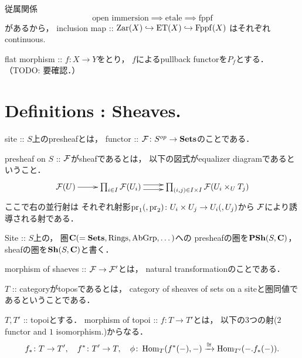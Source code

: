 \documentclass[a4paper]{jsarticle}
\begin{document}
\begin{Example}
    従属関係
    \[ \text{open immersion} \implies \text{etale} \implies \text{fppf} \]
    があるから，
    inclusion map :: $\mathrm{Zar}(X) \hookrightarrow \mathrm{ET}(X) \hookrightarrow \mathrm{Fppf}(X)$
    はそれぞれcontinuous.
\end{Example}

\begin{Example}
    flat morphism :: $f \colon X \to Y$をとり，
    $f$によるpullback functorを$P_{f}$とする．
    （TODO: 要確認．）
\end{Example}

\section{Definitions : Sheaves.}
\begin{Def}
    \begin{myenum}{\roman*}
    \item
    site :: $S$上のpresheafとは，
    functor :: $\mathcal{F} \colon S^{op} \to \mathbf{Sets}$のことである．

    \item
    presheaf on $S$ :: $\mathcal{F}$がsheafであるとは，
    以下の図式がequalizer diagramであるということ．
    \[\xymatrix{
        \shF(U) \ar[r]& \prod_{i \in I} \shF(U_i)
            \ar@<1mm>[r]\ar@<-1mm>[r]& \prod_{(i,j) \in I \times I} \shF(U_i \times_U T_j)
    }\]
    ここで右の並行射は
    それぞれ射影$\operatorname{pr}_1(, \operatorname{pr}_2) \colon U_i \times U_j \to U_i(, U_j)$から
    $\mathcal{F}$により誘導される射である．

    \item
    Site :: $S$上の，
    圏$\mathbf{C}(=\mathbf{Sets}, \mathrm{Rings}, \mathrm{AbGrp}, \dots)$への
    presheafの圏を$\mathbf{PSh}(S, \mathbf{C})$，sheafの圏を$\mathbf{Sh}(S, \mathbf{C})$と書く．

    \item
    morphism of shaeves :: $\mathcal{F} \to \mathcal{F}'$とは，
    natural transformationのことである．

    \item
    $T$ :: categoryがtoposであるとは，
    category of sheaves of sets on a siteと圏同値であるということである．

    \item
    $T, T'$ :: topoiとする．
    morphism of topoi :: $f \colon T \to T'$とは，
    以下の$3$つの射($2$ functor and $1$ isomorphism.)からなる．
    \[
        f_* \colon T \to T', \quad f^* \colon T' \to T,
        \quad \phi \colon \operatorname{Hom}_{T}(f^*(-), -) \xrightarrow{\cong} \operatorname{Hom}_{T'}(-. f_*(-)).
    \]
\end{myenum}
\end{Def}
\end{document}
